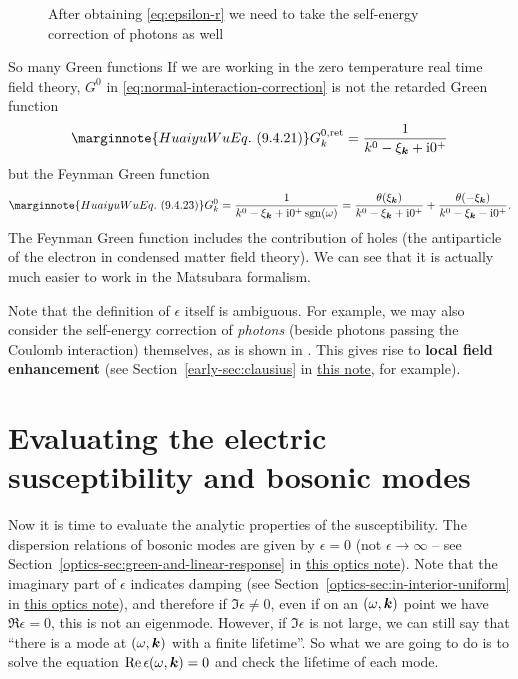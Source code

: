 \documentclass[hyperref, a4paper]{article}
\DeclareMathOperator{\sgn}{sgn}
\newcommand*{\ii}{\mathrm{i}}
\newcommand*{\concept}[1]{{\textbf{#1}}}
\newcommand{\opticsdoc}{\href{../optics/optics.pdf}{this optics note}}
\newcommand{\earlydoc}{\href{../advanced-electrodynamics/early-lectures-1.pdf}{this note}}
\begin{document}
\begin{figure}
    \centering
    
    \caption{After obtaining \eqref{eq:epsilon-r} we need to take the self-energy correction of photons as well}
    \label{fig:another-self-energy}
\end{figure}

\begin{note*}{So many Green functions}
    If we are working in the zero temperature real time field theory, $G^0$ in 
    \eqref{eq:normal-interaction-correction} is not the retarded Green function 
    \begin{equation} \marginnote{Huaiyu Wu Eq.~(9.4.21)}
        G^{0, \text{ret}}_k = \frac{1}{k^0 - \xi_{\vb*{k}} + \ii 0^+} 
    \end{equation}  
    but the Feynman Green function 
    \begin{equation} \marginnote{Huaiyu Wu Eq.~(9.4.23)}
        G^{0}_k = \frac{1}{k^0 - \xi_{\vb*{k}} + \ii 0^+ \sgn(\omega)} = \frac{\theta(\xi_{\vb*{k}})}{k^0 - \xi_{\vb*{k}} + \ii 0^+} + \frac{\theta(- \xi_{\vb*{k}})}{k^0 - \xi_{\vb*{k}} - \ii 0^+}.
    \end{equation}
    The Feynman Green function includes the contribution of holes (the antiparticle of the electron in condensed
    matter field theory). We can see that it is actually much easier to work in the Matsubara formalism.
\end{note*}

Note that the definition of $\epsilon$ itself is ambiguous. For example, we may also consider the 
self-energy correction of \emph{photons} (beside photons passing the Coulomb interaction) themselves, as is shown in .
This gives rise to \concept{local field enhancement} (see Section~\ref{early-sec:clausius} in \earlydoc, 
for example). 

\section{Evaluating the electric susceptibility and bosonic modes}\label{sec:boson-modes}

Now it is time to evaluate the analytic properties of the susceptibility. 
The dispersion relations of bosonic modes are given by $\epsilon = 0$ (not $\epsilon \to \infty$ -- see 
Section~\ref{optics-sec:green-and-linear-response} in \opticsdoc). 
Note that the imaginary part of $\epsilon$ indicates damping (see Section~\ref{optics-sec:in-interior-uniform}
in \opticsdoc), and therefore if $\Im \epsilon \neq 0$, even if on an $(\omega, \vb*{k})$ point we have 
$\Re \epsilon = 0$, this is not an eigenmode. However, if $\Im \epsilon$ is not large, we can still say 
that ``there is a mode at $(\omega, \vb*{k})$ with a finite lifetime''. So what we are going to do is 
to solve the equation $\Re \epsilon(\omega, \vb*{k}) = 0$ and check the lifetime of each mode.
\end{document}
